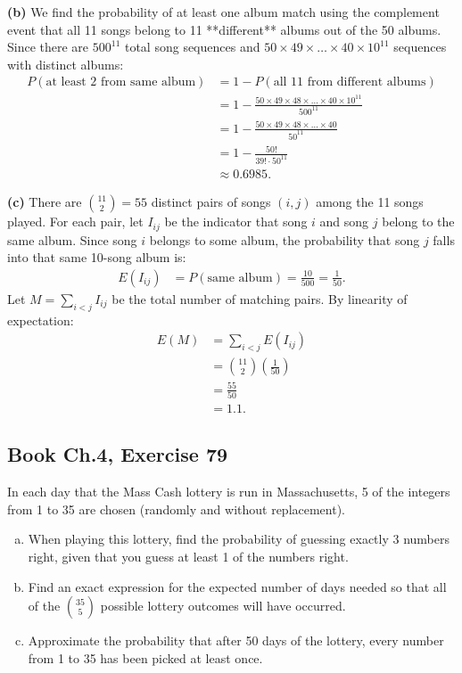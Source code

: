 \documentclass[11pt,a4paper]{article}
\begin{document}
\vspace{4pt}
\noindent \textbf{(b)} We find the probability of at least one album match using the complement event that all 11 songs belong to 11 **different** albums out of the 50 albums. Since there are $500^{11}$ total song sequences and $50 \times 49 \times \dots \times 40 \times 10^{11}$ sequences with distinct albums:
\begin{align*}
P(\text{at least 2 from same album}) &= 1 - P(\text{all 11 from different albums}) \\
&= 1 - \frac{50 \times 49 \times 48 \times \dots \times 40 \times 10^{11}}{500^{11}} \\
&= 1 - \frac{50 \times 49 \times 48 \times \dots \times 40}{50^{11}} \\
&= 1 - \frac{50!}{39! \cdot 50^{11}} \\
&\approx 0.6985.
\end{align*}

\vspace{4pt}
\noindent \textbf{(c)} There are $\binom{11}{2} = 55$ distinct pairs of songs $(i, j)$ among the 11 songs played. For each pair, let $I_{ij}$ be the indicator that song $i$ and song $j$ belong to the same album. Since song $i$ belongs to some album, the probability that song $j$ falls into that same 10-song album is:
\begin{align*}
E(I_{ij}) &= P(\text{same album}) = \frac{10}{500} = \frac{1}{50}.
\end{align*}
Let $M = \sum_{i < j} I_{ij}$ be the total number of matching pairs. By linearity of expectation:
\begin{align*}
E(M) &= \sum_{i < j} E(I_{ij}) \\
&= \binom{11}{2} \left(\frac{1}{50}\right) \\
&= \frac{55}{50} \\
&= 1.1.
\end{align*}

\vspace{10pt}
\subsection{Book Ch.4, Exercise 79}
\begin{tcolorbox}[title={Book Ch.4, Exercise 79}]
In each day that the Mass Cash lottery is run in Massachusetts, 5 of the integers from 1 to 35 are chosen (randomly and without replacement).
\begin{enumerate}[(a)]
\item When playing this lottery, find the probability of guessing exactly 3 numbers right, given that you guess at least 1 of the numbers right.
\item Find an exact expression for the expected number of days needed so that all of the $\binom{35}{5}$ possible lottery outcomes will have occurred.
\item Approximate the probability that after 50 days of the lottery, every number from 1 to 35 has been picked at least once.
\end{enumerate}
\end{tcolorbox}
\end{document}
